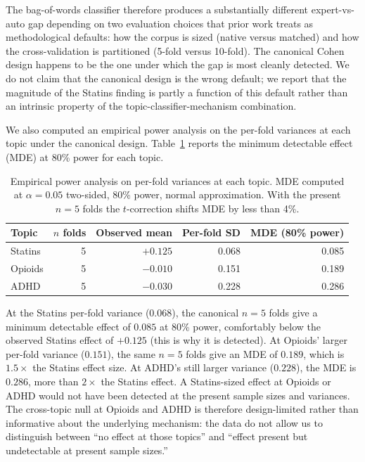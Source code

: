 \documentclass{article}
\begin{document}
The bag-of-words classifier therefore produces a substantially different expert-vs-auto gap depending on two evaluation choices that prior work treats as methodological defaults: how the corpus is sized (native versus matched) and how the cross-validation is partitioned (5-fold versus 10-fold). The canonical Cohen design happens to be the one under which the gap is most cleanly detected. We do not claim that the canonical design is the wrong default; we report that the magnitude of the Statins finding is partly a function of this default rather than an intrinsic property of the topic-classifier-mechanism combination.

We also computed an empirical power analysis on the per-fold variances at each topic under the canonical design. Table~\ref{tab:power} reports the minimum detectable effect (MDE) at 80\% power for each topic.

\begin{table}[h]
\centering
\small
\begin{tabular}{lrrrr}
\toprule
Topic & $n$ folds & Observed mean & Per-fold SD & MDE (80\% power) \\
\midrule
Statins & 5  & $+0.125$ & 0.068 & 0.085 \\
Opioids & 5  & $-0.010$ & 0.151 & 0.189 \\
ADHD    & 5  & $-0.030$ & 0.228 & 0.286 \\
\bottomrule
\end{tabular}
\caption{Empirical power analysis on per-fold variances at each topic. MDE computed at $\alpha = 0.05$ two-sided, 80\% power, normal approximation. With the present $n = 5$ folds the $t$-correction shifts MDE by less than 4\%.}
\label{tab:power}
\end{table}

At the Statins per-fold variance ($0.068$), the canonical $n = 5$ folds give a minimum detectable effect of $0.085$ at 80\% power, comfortably below the observed Statins effect of $+0.125$ (this is why it is detected). At Opioids' larger per-fold variance ($0.151$), the same $n = 5$ folds give an MDE of $0.189$, which is $1.5\times$ the Statins effect size. At ADHD's still larger variance ($0.228$), the MDE is $0.286$, more than $2\times$ the Statins effect. A Statins-sized effect at Opioids or ADHD would not have been detected at the present sample sizes and variances. The cross-topic null at Opioids and ADHD is therefore design-limited rather than informative about the underlying mechanism: the data do not allow us to distinguish between ``no effect at those topics'' and ``effect present but undetectable at present sample sizes.''
\end{document}
